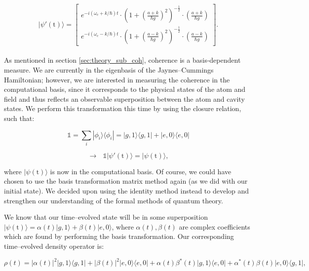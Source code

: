 \documentclass[12pt]{article}
\begin{document}
\begin{equation*}
    |\psi'(\text{t})\rangle = 
    \begin{bmatrix}
        e^{-i(\omega_c + k/\hbar)t}\cdot\left(1 + \left(\frac{a + k}{\hbar g}\right)^2\right)^{-\frac{1}{2}}\cdot\left(\frac{a + k}{\hbar g}\right) \\
        e^{-i(\omega_c - k/\hbar)t}\cdot\left(1 + \left(\frac{a - k}{\hbar g}\right)^2\right)^{-\frac{1}{2}}\cdot\left(\frac{a - k}{\hbar g}\right)
    \end{bmatrix}.
\end{equation*}
\\
As mentioned in section \ref{sec:theory_sub_coh}, coherence is a basis-dependent measure. We are currently in the eigenbasis of the Jaynes--Cummings Hamiltonian; however, we are interested in measuring the coherence in the computational basis, since it corresponds to the physical states of the atom and field and thus reflects an observable superposition between the atom and cavity states. We perform this transformation this time by using the closure relation, such that:

\begin{equation*}
    \mathds{1} = \sum_i|\phi_i\rangle\langle\phi_i| = |g,1\rangle\langle g,1| + |e,0\rangle\langle e,0|
\end{equation*}

\begin{equation*}
    \rightarrow \text{  } \mathds{1}|\psi'(\text{t})\rangle = |\psi(\text{t})\rangle,
\end{equation*}


where $|\psi(\text{t})\rangle$ is now in the computational basis. Of course, we could have chosen to use the basis transformation matrix method again (as we did with our initial state). We decided upon using the identity method instead to develop and strengthen our understanding of the formal methods of quantum theory. 

We know that our time--evolved state will be in some superposition $|\psi(\text{t})\rangle = \alpha(t)|g,1\rangle + \beta(t)|e,0\rangle$, where $\alpha(t),\beta(t)$ are complex coefficients which are found by performing the basis transformation. Our corresponding time--evolved density operator is:

\begin{equation} \label{eqn:JCM_dm(t)_closed}
    \rho(t) = |\alpha(t)|^2|g,1\rangle\langle g,1| + |\beta(t)|^2 |e,0\rangle\langle e,0| + \alpha(t)\beta^*(t)|g,1\rangle\langle e,0| + \alpha^*(t)\beta(t)|e,0\rangle\langle g,1|,
\end{equation}
\end{document}
